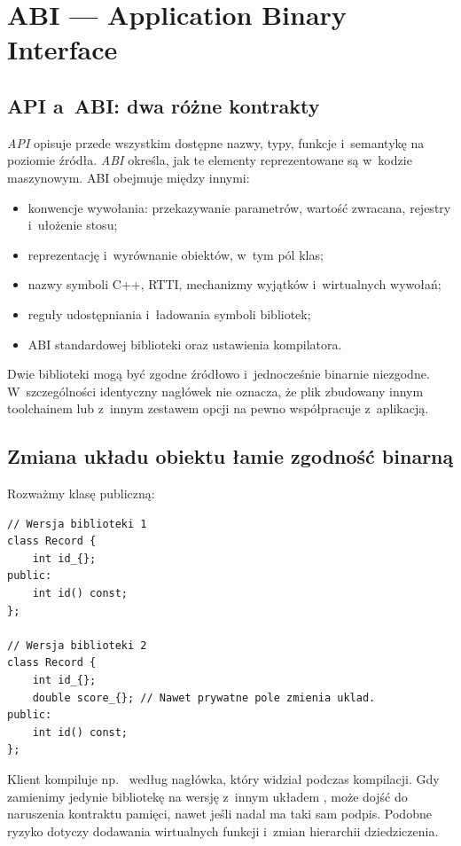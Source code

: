 \section{ABI --- Application Binary Interface}
\label{sec:cpp17-abi}

\subsection{API a~ABI: dwa różne kontrakty}

\emph{API} opisuje przede wszystkim dostępne nazwy, typy, funkcje
i~semantykę na poziomie źródła. \emph{ABI} określa, jak te elementy
reprezentowane są w~kodzie maszynowym. ABI obejmuje między innymi:
\begin{itemize}
\item konwencje wywołania: przekazywanie parametrów, wartość zwracana,
      rejestry i~ułożenie stosu;
\item reprezentację i~wyrównanie obiektów, w~tym pól klas;
\item nazwy symboli C++, RTTI, mechanizmy wyjątków i~wirtualnych wywołań;
\item reguły udostępniania i~ładowania symboli bibliotek;
\item ABI standardowej biblioteki oraz ustawienia kompilatora.
\end{itemize}

Dwie biblioteki mogą być zgodne źródłowo i~jednocześnie binarnie
niezgodne. W~szczególności identyczny nagłówek nie oznacza, że plik
 zbudowany innym toolchainem lub z~innym zestawem opcji
na pewno współpracuje z~aplikacją.

\subsection{Zmiana układu obiektu łamie zgodność binarną}

Rozważmy klasę publiczną:
\begin{lstlisting}[caption={Zmiana prywatnych pol nadal moze zmienic ABI.}]
// Wersja biblioteki 1
class Record {
    int id_{};
public:
    int id() const;
};

// Wersja biblioteki 2
class Record {
    int id_{};
    double score_{}; // Nawet prywatne pole zmienia uklad.
public:
    int id() const;
};
\end{lstlisting}

Klient kompiluje np.~ według nagłówka,
który widział podczas kompilacji. Gdy zamienimy jedynie bibliotekę
na wersję z~innym układem , może dojść do naruszenia
kontraktu pamięci, nawet jeśli  nadal ma taki sam podpis.
Podobne ryzyko dotyczy dodawania wirtualnych funkcji i~zmian
hierarchii dziedziczenia.

